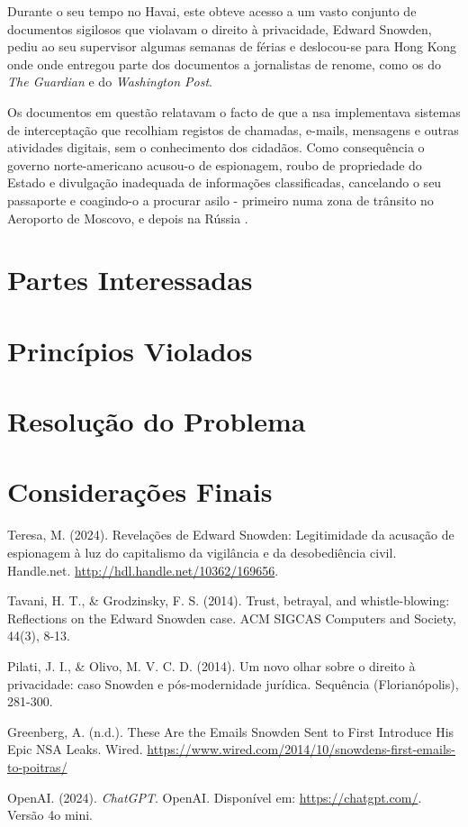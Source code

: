 \documentclass[a4paper,12pt]{article}
\begin{document}
Durante o seu tempo no Havai, este obteve acesso a um vasto conjunto de documentos sigilosos que violavam o direito à privacidade, Edward Snowden, pediu ao seu supervisor algumas semanas de férias e deslocou-se para Hong Kong onde onde entregou parte dos documentos a jornalistas de renome, como os do \textit{The Guardian} e do \textit{Washington Post}.

Os documentos em questão relatavam o facto de que a \acrshort{nsa} implementava sistemas de interceptação que recolhiam registos de chamadas, e-mails, mensagens e outras atividades digitais, sem o conhecimento dos cidadãos. Como consequência o governo norte-americano acusou-o de espionagem, roubo de propriedade do Estado e divulgação inadequada de informações classificadas, cancelando o seu passaporte e coagindo-o a procurar asilo - primeiro numa zona de trânsito no Aeroporto de Moscovo, e depois na Rússia \cite{pilati}.


\section{Partes Interessadas}

\section{Princípios Violados}

\section{Resolução do Problema}

\section{Considerações Finais}

\begin{thebibliography}{10}

    Teresa, M. (2024). Revelações de Edward Snowden: Legitimidade da acusação de espionagem à luz do capitalismo da vigilância e da desobediência civil. Handle.net. \url{http://hdl.handle.net/10362/169656}.


        Tavani, H. T., \& Grodzinsky, F. S. (2014). Trust, betrayal, and whistle-blowing: Reflections on the Edward Snowden case. ACM SIGCAS Computers and Society, 44(3), 8-13.
    
    Pilati, J. I., \& Olivo, M. V. C. D. (2014). Um novo olhar sobre o direito à privacidade: caso Snowden e pós-modernidade jurídica. Sequência (Florianópolis), 281-300.
    
    Greenberg, A. (n.d.). These Are the Emails Snowden Sent to First Introduce His Epic NSA Leaks. Wired. \url{https://www.wired.com/2014/10/snowdens-first-emails-to-poitras/}


    
    
        OpenAI. (2024). \textit{ChatGPT}. OpenAI. Disponível em: \url{https://chatgpt.com/}. Versão 4o mini.
    
   
\end{thebibliography}

\printglossaries
\end{document}
